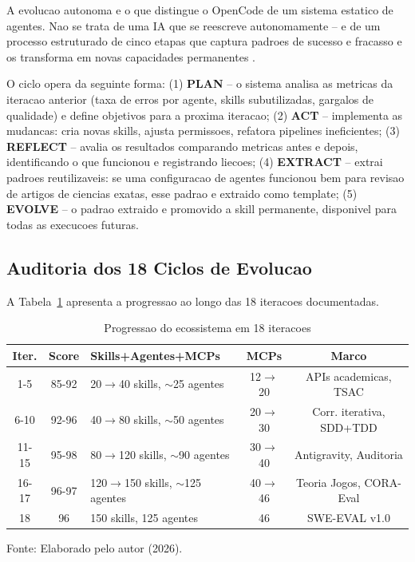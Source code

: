 \documentclass[12pt,a4paper,oneside,sumario=tradicional,chapter=TITLE,section=TITLE,subsection=TITLE,english,brazil]{abntex2}
\begin{document}
A evolucao autonoma e o que distingue o OpenCode de um sistema estatico de agentes. Nao se trata de uma IA que se reescreve autonomamente -- e de um processo estruturado de cinco etapas que captura padroes de sucesso e fracasso e os transforma em novas capacidades permanentes \cite{macedo2026engenharia}.

O ciclo opera da seguinte forma: (1) \textbf{PLAN} -- o sistema analisa as metricas da iteracao anterior (taxa de erros por agente, skills subutilizadas, gargalos de qualidade) e define objetivos para a proxima iteracao; (2) \textbf{ACT} -- implementa as mudancas: cria novas skills, ajusta permissoes, refatora pipelines ineficientes; (3) \textbf{REFLECT} -- avalia os resultados comparando metricas antes e depois, identificando o que funcionou e registrando liecoes; (4) \textbf{EXTRACT} -- extrai padroes reutilizaveis: se uma configuracao de agentes funcionou bem para revisao de artigos de ciencias exatas, esse padrao e extraido como template; (5) \textbf{EVOLVE} -- o padrao extraido e promovido a skill permanente, disponivel para todas as execucoes futuras.

\subsection{Auditoria dos 18 Ciclos de Evolucao}

A Tabela~\ref{tab:evo} apresenta a progressao ao longo das 18 iteracoes documentadas.

\begin{table}[H]\centering\caption{Progressao do ecossistema em 18 iteracoes}\label{tab:evo}
\small
\begin{tabular}{cclcc}\toprule\textbf{Iter.} & \textbf{Score} & \textbf{Skills+Agentes+MCPs} & \textbf{MCPs} & \textbf{Marco} \\\midrule
1-5 & 85-92 & 20$\to$40 skills, $\sim$25 agentes & 12$\to$20 & APIs academicas, TSAC \\
6-10 & 92-96 & 40$\to$80 skills, $\sim$50 agentes & 20$\to$30 & Corr. iterativa, SDD+TDD \\
11-15 & 95-98 & 80$\to$120 skills, $\sim$90 agentes & 30$\to$40 & Antigravity, Auditoria \\
16-17 & 96-97 & 120$\to$150 skills, $\sim$125 agentes & 40$\to$46 & Teoria Jogos, CORA-Eval \\
18 & 96 & 150 skills, 125 agentes & 46 & SWE-EVAL v1.0 \\\bottomrule
\end{tabular}
\small\vspace{2pt}Fonte: Elaborado pelo autor (2026).\smallskip
\end{table}
\end{document}
